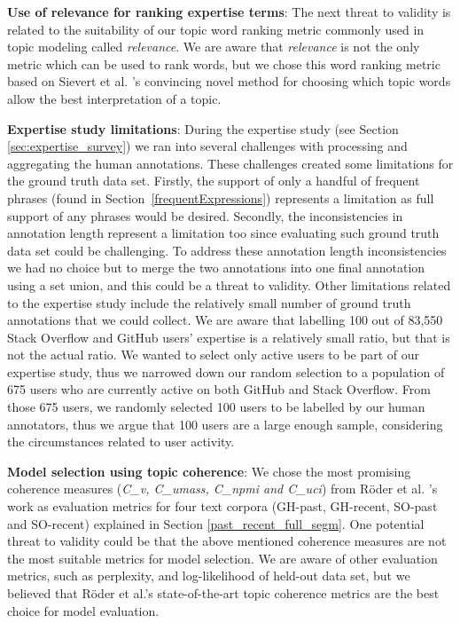         \textbf{Use of relevance for ranking expertise terms}: The next threat to validity is related to the suitability of our topic word ranking metric commonly used in topic modeling called \emph{relevance}\cite{sievert2014ldavis}. We are aware that \emph{relevance} is not the only metric which can be used to rank words, but we chose this word ranking metric based on Sievert et al. \cite{sievert2014ldavis}'s convincing novel method for choosing which topic words allow the best interpretation of a topic. 
        
        \textbf{Expertise study limitations}: During the expertise study (see Section \ref{sec:expertise_survey}) we ran into several challenges with processing and aggregating the human annotations. These challenges created some limitations for the ground truth data set. Firstly, the support of only a handful of frequent phrases (found in Section~\ref{frequentExpressions}) represents a limitation as full support of any phrases would be desired. Secondly, the inconsistencies in annotation length represent a limitation too since evaluating such ground truth data set could be challenging. To address these annotation length inconsistencies we had no choice but to merge the two annotations into one final annotation using a set union, and this could be a threat to validity. Other limitations related to the expertise study include the relatively small number of ground truth annotations that we could collect. We are aware that labelling 100 out of 83,550 Stack Overflow and GitHub users' expertise is a relatively small ratio, but that is not the actual ratio. We wanted to select only active users to be part of our expertise study, thus we narrowed down our random selection to a population of 675 users who are currently active on both GitHub and Stack Overflow. From those 675 users, we randomly selected 100 users to be labelled by our human annotators, thus we argue that 100 users are a large enough sample, considering the circumstances related to user activity.
        
        \textbf{Model selection using topic coherence}: We chose the most promising coherence measures (\emph{C\_v, C\_umass, C\_npmi and C\_uci}) from R{\"o}der et al. \cite{roder2015exploring}'s work as evaluation metrics for four text corpora (GH-past, GH-recent, SO-past and SO-recent) explained in Section \ref{past_recent_full_segm}. One potential threat to validity could be that the above mentioned coherence measures are not the most suitable metrics for model selection. We are aware of other evaluation metrics, such as perplexity, and log-likelihood of held-out data set, but we believed that R{\"o}der et al.'s state-of-the-art topic coherence metrics are the best choice for model evaluation.
        
